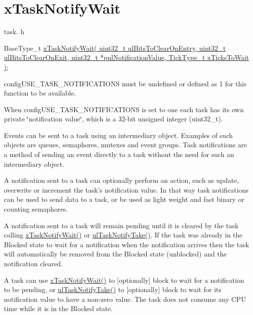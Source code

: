 \hypertarget{group__xTaskNotifyWait}{\section{x\-Task\-Notify\-Wait}
\label{group__xTaskNotifyWait}
}
task. h 
\begin{DoxyPre}BaseType\_t \hyperlink{task_8h_a0475fcda9718f403521c270a7270ff93}{xTaskNotifyWait( uint32\_t ulBitsToClearOnEntry, uint32\_t ulBitsToClearOnExit, uint32\_t *pulNotificationValue, TickType\_t xTicksToWait )};\end{DoxyPre}


config\-U\-S\-E\-\_\-\-T\-A\-S\-K\-\_\-\-N\-O\-T\-I\-F\-I\-C\-A\-T\-I\-O\-N\-S must be undefined or defined as 1 for this function to be available.

When config\-U\-S\-E\-\_\-\-T\-A\-S\-K\-\_\-\-N\-O\-T\-I\-F\-I\-C\-A\-T\-I\-O\-N\-S is set to one each task has its own private \char`\"{}notification value\char`\"{}, which is a 32-\/bit unsigned integer (uint32\-\_\-t).

Events can be sent to a task using an intermediary object. Examples of such objects are queues, semaphores, mutexes and event groups. Task notifications are a method of sending an event directly to a task without the need for such an intermediary object.

A notification sent to a task can optionally perform an action, such as update, overwrite or increment the task's notification value. In that way task notifications can be used to send data to a task, or be used as light weight and fast binary or counting semaphores.

A notification sent to a task will remain pending until it is cleared by the task calling \hyperlink{task_8h_a0475fcda9718f403521c270a7270ff93}{x\-Task\-Notify\-Wait()} or \hyperlink{task_8h_a66540bef602522a01a519f776e4c07d8}{ul\-Task\-Notify\-Take()}. If the task was already in the Blocked state to wait for a notification when the notification arrives then the task will automatically be removed from the Blocked state (unblocked) and the notification cleared.

A task can use \hyperlink{task_8h_a0475fcda9718f403521c270a7270ff93}{x\-Task\-Notify\-Wait()} to \mbox{[}optionally\mbox{]} block to wait for a notification to be pending, or \hyperlink{task_8h_a66540bef602522a01a519f776e4c07d8}{ul\-Task\-Notify\-Take()} to \mbox{[}optionally\mbox{]} block to wait for its notification value to have a non-\/zero value. The task does not consume any C\-P\-U time while it is in the Blocked state.

